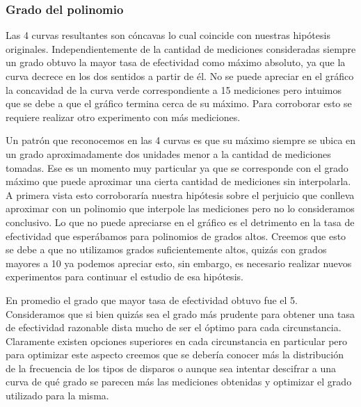 \subsubsection{Grado del polinomio}
Las 4 curvas resultantes son cóncavas lo cual coincide con nuestras hipótesis originales. Independientemente de la cantidad
de mediciones consideradas siempre un grado obtuvo la mayor tasa de efectividad como máximo absoluto, ya que la curva decrece
en los dos sentidos a partir de él. No se puede apreciar en el gráfico la concavidad de la curva verde correspondiente a 15 mediciones
pero intuimos que se debe a que el gráfico termina cerca de su máximo. Para corroborar esto se requiere realizar otro experimento
con más mediciones.
\par
Un patrón que reconocemos en las 4 curvas es que su máximo siempre se ubica en un grado aproximadamente dos unidades menor a la
cantidad de mediciones tomadas. Ese es un momento muy particular ya que se corresponde con el grado máximo que puede aproximar
una cierta cantidad de mediciones sin interpolarla. A primera vista esto corroboraría nuestra hipótesis sobre el perjuicio que
conlleva aproximar con un polinomio que interpole las mediciones pero no lo consideramos conclusivo. Lo que no puede apreciarse 
en el gráfico es el detrimento en la tasa de efectividad que esperábamos para polinomios de grados altos. Creemos que esto se 
debe a que no utilizamos grados suficientemente altos, quizás con grados mayores a 10 ya podemos apreciar esto, sin embargo, 
es necesario realizar nuevos experimentos para continuar el estudio de esa hipótesis.
\par
En promedio el grado que mayor tasa de efectividad obtuvo fue el 5. Consideramos que si bien quizás sea el grado más prudente
para obtener una tasa de efectividad razonable dista mucho de ser el óptimo para cada circunstancia. Claramente existen
opciones superiores en cada circunstancia en particular pero para optimizar este aspecto creemos que se debería conocer
más la distribución de la frecuencia de los tipos de disparos o aunque sea intentar descifrar a una curva de qué grado
se parecen más las mediciones obtenidas y optimizar el grado utilizado para la misma.

